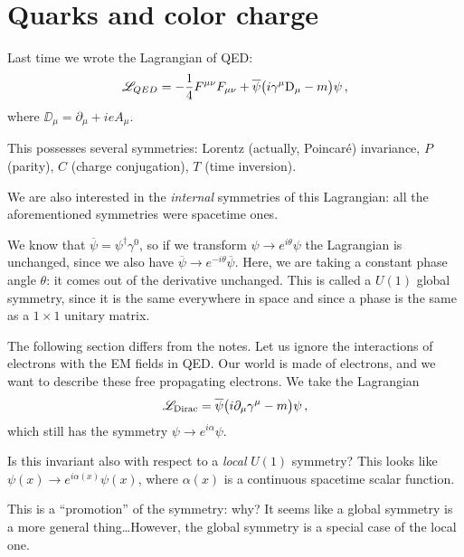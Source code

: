 \documentclass[main.tex]{subfiles}
\begin{document}
\section{Quarks and color charge}


Last time we wrote the Lagrangian of QED: 
%
\begin{align}
\mathscr{L}_{QED} = - \frac{1}{4} F^{\mu \nu } F_{\mu \nu } 
+ \overline{\psi} \qty(i \gamma^{\mu } \mathrm{D}_{\mu } -m) \psi 
\,,
\end{align}
%
where \(\DD_{\mu } = \partial_{\mu } + i e A_{\mu }\).

This possesses several symmetries: Lorentz (actually, Poincaré) invariance, \(P\) (parity), \(C\) (charge conjugation), \(T\) (time inversion). 

We are also interested in the \emph{internal} symmetries of this Lagrangian: all the aforementioned symmetries were spacetime ones.

We know that \(\overline{\psi} = \psi ^\dag \gamma^{0}\), so if we transform \(\psi \to e^{i \theta } \psi \) the Lagrangian is unchanged, since we also have \(\overline{\psi} \to e^{-i \theta } \overline{\psi} \).
Here, we are taking a constant phase angle \(\theta \): it comes out of the derivative unchanged. 
This is called a \(U(1)\) global symmetry, since it is the same everywhere in space and since a phase is the same as a \(1 \times 1 \) unitary matrix.

The following section differs from the notes. 
Let us ignore the interactions of electrons with the EM fields in QED. 
Our world is made of electrons, and we want to describe these free propagating electrons. 
We take the Lagrangian 
%
\begin{align}
\mathscr{L}_{\text{Dirac}} = \overline{\psi} \qty(i \partial_{\mu } \gamma^{\mu } -m) \psi 
\,,
\end{align}
%
which still has the symmetry \(\psi \to e^{i \alpha } \psi \). 

Is this invariant also with respect to a \emph{local} \(U(1)\) symmetry? This looks like \(\psi (x) \to e^{i \alpha (x)} \psi (x)\), where \(\alpha (x)\) is a continuous spacetime scalar function. 

This is a ``promotion'' of the symmetry: why? It seems like a global symmetry is a more general thing\dots However, the global symmetry is a special case of the local one. 
\end{document}
